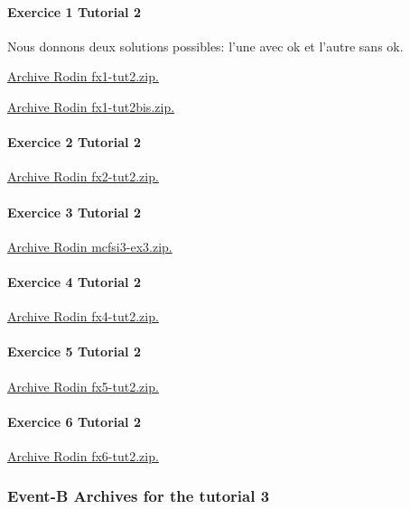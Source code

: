 \documentclass[ 12pt]{article}
\begin{document}
\paragraph{Exercice 1 Tutorial 2}

Nous donnons deux solutions possibles: l'une avec ok et l'autre sans ok.

\href{http://mery54.github.io/teaching/mosos/models/fx1-tut2.zip}{Archive 
  Rodin   fx1-tut2.zip.}


\href{http://mery54.github.io/teaching/mosos/models/fx1-tut2.zip}{Archive 
  Rodin   fx1-tut2bis.zip.}


\paragraph{Exercice 2 Tutorial 2}



\href{http://mery54.github.io/teaching/mosos/models/fx2-tut2.zip}{Archive 
  Rodin   fx2-tut2.zip.}


\paragraph{Exercice 3 Tutorial 2}
\href{http://mery54.github.io/teaching/mosos/models/mcfsi3-ex3.zip}{Archive 
  Rodin  mcfsi3-ex3.zip.}



\paragraph{Exercice 4 Tutorial 2}
\href{http://mery54.github.io/teaching/mosos/models/fx4-tut2.zip}{Archive 
  Rodin   fx4-tut2.zip.}




\paragraph{Exercice 5 Tutorial 2}
\href{http://mery54.github.io/teaching/mosos/models/fx5-tut2.zip}{Archive 
  Rodin   fx5-tut2.zip.}



\paragraph{Exercice 6 Tutorial 2}
\href{http://mery54.github.io/teaching/mosos/models/fx6-tut2.zip}{Archive 
  Rodin   fx6-tut2.zip.}



 \subsubsection{Event-B Archives for   the tutorial 3}
\label{sec:event-b-archives}
\end{document}
